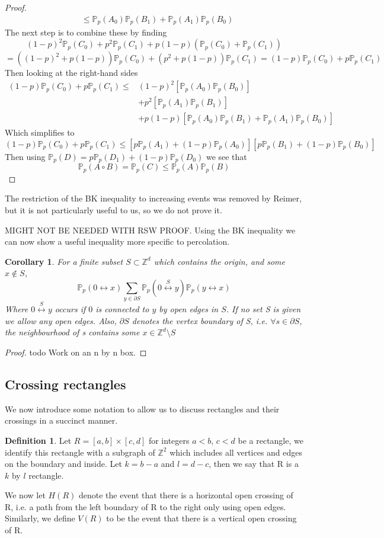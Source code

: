 \documentclass[a4paper,11pt]{article}
\newtheorem{corollary}[theorem]{Corollary}
\theoremstyle{definition}
\newtheorem{definition}[theorem]{Definition}
\newcommand{\ints}{\mathbb{Z}}
\newcommand{\prob}{\mathbb{P}_p}
\begin{document}
\begin{proof}
\begin{align*}
								&\leq \prob(A_0)\prob(B_1) + \prob(A_1)\prob(B_0)
	\end{align*}
	The next step is to combine these by finding 
	$$(1-p)^2\prob(C_0) + p^2\prob(C_1) + p(1-p)(\prob(C_0) + \prob(C_1))$$
	$$=((1-p)^2 + p(1-p))\prob(C_0) + (p^2 + p(1-p))\prob(C_1) = (1-p)\prob(C_0) + p\prob(C_1)$$
	Then looking at the right-hand sides
	\begin{align*}
		(1-p)\prob(C_0) + p\prob(C_1) \leq& (1-p)^2[\prob(A_0)\prob(B_0)]\\
		&+ p^2[\prob(A_1)\prob(B_1)]\\
		& +p(1-p)[\prob(A_0)\prob(B_1) + \prob(A_1)\prob(B_0)]
	\end{align*}
	Which simplifies to 
	$$(1-p)\prob(C_0) + p\prob(C_1) \leq [p\prob(A_1) + (1-p)\prob(A_0)][p\prob(B_1) + (1-p)\prob(B_0)]$$
	Then using $\prob(D) = p\prob(D_1) + (1-p)\prob(D_0)$ we see that
	$$\prob(A \circ B) = \prob(C) \leq \prob(A)\prob(B)$$

\end{proof}
The restriction of the BK inequality to increasing events was removed by Reimer, but it is not particularly useful to us, so we do not prove it.

{\color{red} MIGHT NOT BE NEEDED WITH RSW PROOF.
Using the BK inequality we can now show a useful inequality more specific to percolation.
\begin{corollary}
	For a finite subset $S \subset \ints^d$ which contains the origin, and some $x \notin S$, 
	$$\prob(0 \longleftrightarrow x) \sum_{y\in \partial S} \prob({0\stackrel{S}{\longleftrightarrow}y})\prob(y \longleftrightarrow x)$$
	Where $0\stackrel{S}{\longleftrightarrow}y$ occurs if $0$ is connected to $y$ by open edges in $S$. If no set S is given we allow any open edges.
	Also, $\partial S$ denotes the vertex boundary of S, i.e. $\forall s \in \partial S$, the neighbourhood of s contains some $x \in \ints^d \setminus S$
\end{corollary}
\begin{proof}
	{\color{red} todo}
	Work on an n by n box.
\end{proof}
}
\subsection{Crossing rectangles}

We now introduce some notation to allow us to discuss rectangles and their crossings in a succinct manner.
\begin{definition}
	Let $R = [a,b]\times[c, d]$ for integers $a<b$, $c<d$ be a rectangle, we identify this rectangle with a subgraph of $\ints^2$ which includes all vertices and edges on the boundary and inside. Let $k = b-a$ and $l = d-c$, then we say that R is a $k$ by $l$ rectangle.
	
	We now let $H(R)$ denote the event that there is a horizontal open crossing of R, i.e. a path from the left boundary of R to the right only using open edges. Similarly, we define $V(R)$ to be the event that there is a vertical open crossing of R. 
\end{definition}
\end{document}

